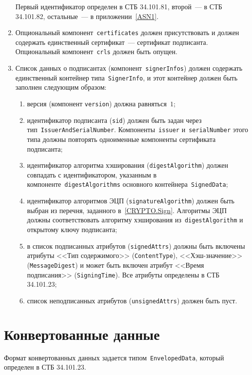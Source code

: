 \begin{enumerate}
Первый идентификатор определен в СТБ 34.101.81, второй~--- в СТБ 
34.101.82, остальные~--- в приложении~\ref{ASN1}.

\item
Опциональный компонент~\texttt{certificates} должен присутствовать и 
должен содержать единственный сертификат~--- сертификат подписанта.
%
Опциональный компонент~\texttt{crls} должен быть опущен.

\item
Список данных о подписантах (компонент~\texttt{signerInfos}) должен 
содержать единственный контейнер типа~\texttt{SignerInfo}, и этот 
контейнер должен быть заполнен следующим образом: 
\begin{enumerate}
\item
версия (компонент \texttt{version}) должна равняться~$1$;
\item
идентификатор подписанта (\texttt{sid}) должен быть задан через
тип~\texttt{IssuerAndSerialNumber}. Компоненты~\texttt{issuer} 
и~\texttt{serialNumber} этого типа должны повторять одноименные компоненты 
сертификата подписанта;
\item
идентификатор алгоритма хэширования (\texttt{digestAlgorithm}) должен 
совпадать с идентификатором, указанным в 
компоненте~\texttt{digestAlgorithms} основного  
контейнера~\texttt{SignedData};
\item
идентификатор алгоритмов ЭЦП (\texttt{signatureAlgorithm}) должен 
быть выбран из перечня, заданного в~\ref{CRYPTO.Sign}. 
Алгоритмы ЭЦП должны соответствовать алгоритму хэширования
из~\texttt{digestAlgorithm} и открытому ключу подписанта;
\item
в список подписанных атрибутов (\texttt{signedAttrs}) должны 
быть включены атрибуты <<Тип содержимого>> (\texttt{ContentType}),
<<Хэш-значение>> (\texttt{MessageDigest}) и может быть включен
атрибут <<Время подписания>> (\texttt{SigningTime}). 
Все атрибуты определены в СТБ 34.101.23;
\item
список неподписанных атрибутов (\texttt{unsignedAttrs}) должен быть пуст.
\end{enumerate}
\end{enumerate}

\section{Конвертованные данные}\label{FMT.EnvelopedData}

Формат конвертованных данных задается типом~\texttt{EnvelopedData}, который
определен в СТБ 34.101.23. 

